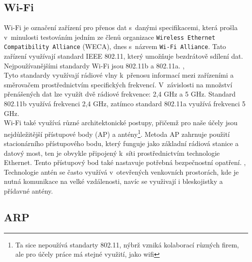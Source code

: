 \documentclass[12pt]{report}			%
\begin{document}
				\subsection{Wi-Fi}
				
				
Wi-Fi je označení zařízení pro přenos dat s~danými specifikacemi, která prošla v~minulosti testováním jedním ze členů organizace \texttt{Wireless Ethernet Compatibility Alliance} (WECA),  dnes s~názvem \texttt{Wi-Fi Alliance}. Tato zařízení využívají standard IEEE 802.11, který umožňuje bezdrátově sdílení dat. Nejpoužívanějšími standardy Wi-Fi jsou 802.11b a 802.11a. \cite{WiFi1}, \cite{WiFi2}
\\
Tyto standardy využívají rádiové vlny k~přenosu informací mezi zařízeními a směrovačem prostřednictvím specifických frekvencí. V~závislosti na množství přenášených dat lze využít dvě rádiové frekvence: 2,4 GHz a 5 GHz. Standard 802.11b využívá frekvenci 2,4 GHz, zatímco standard 802.11a využívá frekvenci 5 GHz. \cite{WiFi1}
\\
Wi-Fi také využívá různé architektonické postupy, přičemž pro naše účely jsou nejdůležitější přístupové body (AP) a antény\footnote{Ta sice nepoužívá standarty 802.11, nýbrž vzniká kolaborací různých firem, ale pro účely práce má stejné využití, jako wifi}. Metoda AP zahrnuje použití stacionárního přístupového bodu, který funguje jako základní rádiová stanice a datový most, ten je obvykle připojený k~síti prostřednictvím technologie Ethernet. Tento přístupový bod také nastavuje potřebná bezpečnostní opatření. \cite{WiFi1}, \cite{Pruvodce}
\\
Technologie antén se často využívá v~otevřených venkovních prostorách, kde je nutná komunikace na velké vzdálenosti, navíc se využivají i bleskojistky a přídavné antény. \cite{Pruvodce}


				\subsection{ARP}
				
\end{document}
